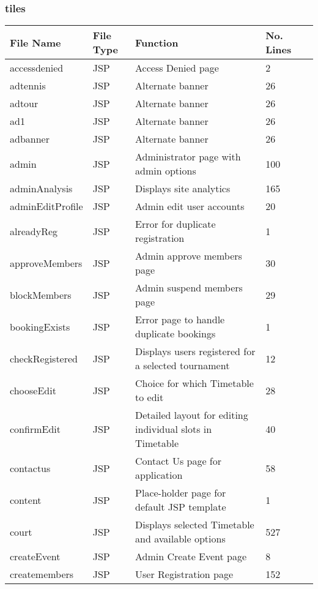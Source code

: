 \subsubsection{tiles}
\begin{table}[H]
\begin{center}
     \begin{tabular}{| l | l | l| l |p{1cm} |}
    \hline
    File Name & File Type & Function & No. Lines\\ \hline
	accessdenied & JSP & Access Denied page & 2\\ \hline
	adtennis & JSP & Alternate banner & 26\\ \hline	
	adtour & JSP & Alternate banner & 26\\ \hline	
	ad1 & JSP & Alternate banner & 26\\ \hline	
	adbanner & JSP & Alternate banner & 26\\ \hline		
	admin & JSP & Administrator page with admin options & 100\\ \hline	
	adminAnalysis & JSP & Displays site analytics & 165\\ \hline	
	adminEditProfile & JSP & Admin edit user accounts & 20\\ \hline	
	alreadyReg & JSP & Error for duplicate registration & 1 \\ \hline	
	approveMembers & JSP & Admin approve members page & 30\\ \hline	
	blockMembers & JSP & Admin suspend members page & 29\\ \hline	
	bookingExists & JSP & Error page to handle duplicate bookings & 1\\ \hline	
	checkRegistered & JSP & Displays users registered for a selected tournament & 12\\ \hline	
	chooseEdit & JSP & Choice for which Timetable to edit & 28\\ \hline	
	confirmEdit & JSP & Detailed layout for editing individual slots in Timetable & 40\\ \hline	
	contactus & JSP & Contact Us page for application & 58\\ \hline	
	content & JSP & Place-holder page for default JSP template & 1\\ \hline	
	court & JSP & Displays selected Timetable and available options & 527\\ \hline	
	createEvent & JSP & Admin Create Event page & 8\\ \hline	
	createmembers & JSP & User Registration page & 152\\ \hline	

\end{tabular}
\end{center}
\end{table}
